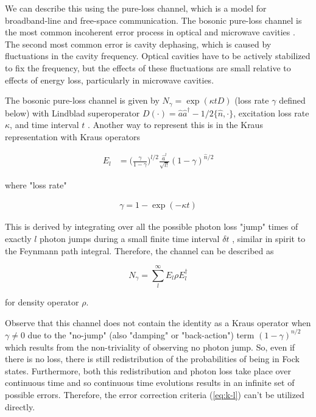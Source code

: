 \documentclass[12]{amsart}
\newcommand\0{\mathbf{0}}
\newcommand\<{\langle}
\renewcommand\>{\rangle}
\begin{document}
We can describe this using the pure-loss channel, which is a model for broadband-line and free-space communication. The bosonic pure-loss channel is the most common incoherent error process in optical and microwave cavities \cite{albert2017performance}. The second most common error is cavity dephasing, which is caused by fluctuations in the cavity frequency. Optical cavities have to be actively stabilized to fix the frequency, but the effects of these fluctuations are small relative to effects of energy loss, particularly in microwave cavities. 

The bosonic pure-loss channel is given by $N_\gamma = \exp(\kappa t D)$ (loss rate $\gamma$ defined below) with Lindblad superoperator $D(\cdot) = \hat{a} \hat{a}^\dag - 1/2 \{ \hat{n} , \cdot \}$, excitation loss rate $\kappa$,  and time interval $t$ \cite{albert2017performance}. Another way to represent this is in the Kraus representation with Kraus operators

\begin{align}
\label{eq:kraus}
E_l &= \Big(\frac{\gamma}{1-\gamma}\Big)^{l / 2} \frac{\hat{a}^l}{\sqrt{l!}}(1 - \gamma)^{\hat{n} / 2}
\end{align}

where "loss rate"

\begin{align}
\label{eq:gamma}
	\gamma = 1 - \exp(- \kappa t)
\end{align}

This is derived by integrating over all the possible photon loss "jump" times of exactly $l$ photon jumps during a small finite time interval $\delta t$ \cite{chuang1997bosonic}, similar in spirit to the Feynmann path integral. Therefore, the channel can be described as 

$$
N_\gamma = \sum_l^\infty E_l \rho E_l^\dag
$$

for density operator $\rho$.

Observe that this channel does not contain the identity as a Kraus operator when $\gamma \neq 0$ due to the "no-jump" (also "damping" or "back-action") term $(1-\gamma)^{n / 2}$ which results from the non-triviality of observing no photon jump. So, even if there is no loss, there is still redistribution of the probabilities of being in Fock states. Furthermore, both this redistribution and photon loss take place over continuous time and so continuous time evolutions results in an infinite set of possible errors. Therefore, the error correction criteria (\ref{eq:k-l}) can't be utilized directly. 
\end{document}

